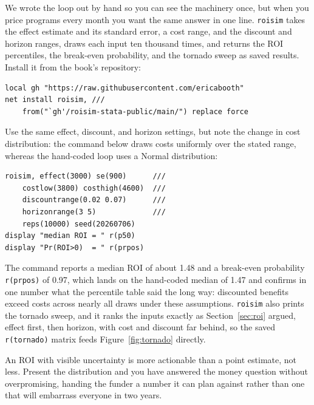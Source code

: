 \begin{kaobox}[frametitle=Package Integration: \texttt{roisim},nobreak=false]
We wrote the loop out by hand so you can see the machinery once, but when you price programs every month you want the same answer in one line. \texttt{roisim} takes the effect estimate and its standard error, a cost range, and the discount and horizon ranges, draws each input ten thousand times, and returns the ROI percentiles, the break-even probability, and the tornado sweep as saved results. Install it from the book's repository:
\par
{\footnotesize
\begin{verbatim}
local gh "https://raw.githubusercontent.com/ericabooth"
net install roisim, ///
    from("`gh'/roisim-stata-public/main/") replace force
\end{verbatim}
}
Use the same effect, discount, and horizon settings, but note the change in cost distribution: the command below draws costs uniformly over the stated range, whereas the hand-coded loop uses a Normal distribution:
\par
{\footnotesize
\begin{verbatim}
roisim, effect(3000) se(900)      ///
    costlow(3800) costhigh(4600)  ///
    discountrange(0.02 0.07)      ///
    horizonrange(3 5)             ///
    reps(10000) seed(20260706)
display "median ROI = " r(p50)
display "Pr(ROI>0)  = " r(prpos)
\end{verbatim}
}
The command reports a median ROI of about 1.48 and a break-even probability \texttt{r(prpos)} of 0.97, which lands on the hand-coded median of 1.47 and confirms in one number what the percentile table said the long way: discounted benefits exceed costs across nearly all draws under these assumptions. \texttt{roisim} also prints the tornado sweep, and it ranks the inputs exactly as Section~\ref{sec:roi} argued, effect first, then horizon, with cost and discount far behind, so the saved \texttt{r(tornado)} matrix feeds Figure~\ref{fig:tornado} directly.
\end{kaobox}

An ROI with visible uncertainty is more actionable than a point estimate, not less. Present the distribution and you have answered the money question without overpromising, handing the funder a number it can plan against rather than one that will embarrass everyone in two years.

